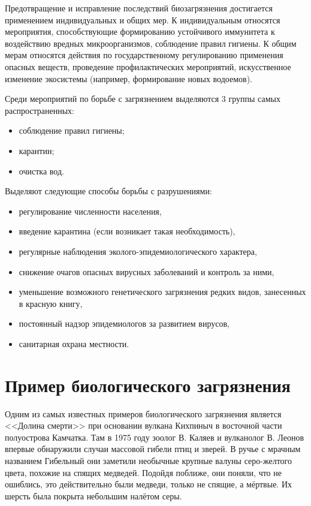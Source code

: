 \documentclass[a4paper, 12pt]{extarticle}
\begin{document}
Предотвращение и исправление последствий биозагрязнения достигается применением индивидуальных и общих мер. К индивидуальным относятся мероприятия, способствующие формированию устойчивого иммунитета к воздействию вредных микроорганизмов, соблюдение правил гигиены. К общим мерам относятся действия по государственному регулированию применения опасных веществ, проведение профилактических мероприятий, искусственное изменение экосистемы (например, формирование новых водоемов).

Среди мероприятий по борьбе с загрязнением выделяются 3 группы самых распространенных:
\begin{itemize}
    \item соблюдение правил гигиены;
    \item карантин;
    \item очистка вод.
\end{itemize}

Выделяют следующие способы борьбы с разрушениями:
\begin{itemize}
    \item регулирование численности населения,
    \item введение карантина (если возникает такая необходимость),
    \item регулярные наблюдения эколого-эпидемиологического характера,
    \item снижение очагов опасных вирусных заболеваний и контроль за ними,
    \item уменьшение возможного генетического загрязнения редких видов, занесенных в красную книгу,
    \item постоянный надзор эпидемиологов за развитием вирусов,
    \item санитарная охрана местности.
\end{itemize}

\section{Пример биологического загрязнения}

Одним из самых известных примеров биологического загрязнения является <<Долина смерти>> при основании вулкана Кихпиныч в восточной части полуострова Камчатка. Там в 1975 году зоолог В. Каляев и вулканолог В. Леонов впервые обнаружили случаи массовой гибели птиц и зверей. В ручье с мрачным названием Гибельный они заметили необычные крупные валуны серо-желтого цвета, похожие на спящих медведей. Подойдя поближе, они поняли, что не ошиблись, это действительно были медведи, только не спящие, а мёртвые. Их шерсть была покрыта небольшим налётом серы.
\end{document}
